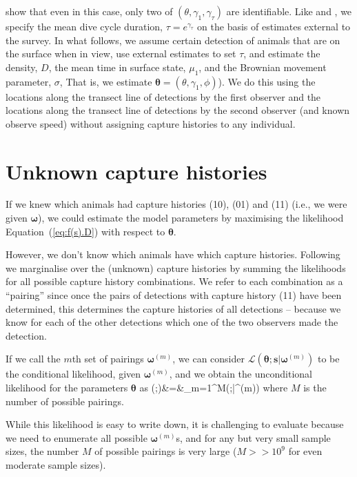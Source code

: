 \documentclass[useAMS, usenatbib, referee]{biom}\usepackage[]{graphicx}\usepackage[]{color}
\begin{document}
\cite{Stevenson+al:18} show that even in this case, only two of $(\theta,\gamma_1,\gamma_\tau)$ are identifiable. Like  \cite{Stevenson+al:18} and \cite{Hiby+Lovell:98}, we specify the mean dive cycle duration, $\tau=e^{\gamma_\tau}$ on the basis of estimates external to the survey. In what follows, we assume certain detection of animals that are on the surface when in view, use external estimates to set $\tau$, and estimate the density, $D$, the mean time in surface state, $\mu_1$, and the Brownian movement parameter, $\sigma$, That is, we estimate $\bm{\theta}=(\theta,\gamma_1, \phi)$). We do this using the locations along the transect line of detections by the first observer and the locations along the transect line of detections by the second observer (and known observe speed) without assigning capture histories to any individual.

\section{Unknown capture histories}

If we knew which animals had capture histories (10), (01) and (11) (i.e., we were given $\bm{\omega}$), we could estimate the model parameters by maximising the likelihood Equation~(\ref{eq:f(s).D}) with respect to $\bm{\theta}$.

However, we don't know which animals have which capture histories. Following \cite{Hiby+Lovell:98} we marginalise over the (unknown) capture histories by summing the likelihoods for all possible capture history combinations. We refer to each combination as a ``pairing'' since once the pairs of detections with capture history (11) have been determined, this determines the capture histories of all detections -- because we know for each of the other detections which one of the two observers made the detection.

If we call the $m$th set of pairings $\bm{\omega}^{(m)}$, we can consider $\mathcal{L}(\bm{\theta};\bm{s}|\bm{\omega}^{(m)})$ to be the conditional likelihood, given $\bm{\omega}^{(m)}$, and we obtain the unconditional likelihood for the parameters $\bm{\theta}$ as
\be
{}(\bm{\theta};)&=&\sum_{m=1}^M(\bm{\theta};|\bm{\omega}^{(m)})
\ee
\noindent
where $M$ is the number of possible pairings.

While this likelihood is easy to write down, it is challenging to evaluate because we need to enumerate all possible $\bm{\omega}^{(m)}$s, and for any but very small sample sizes, the number $M$ of possible pairings is very large ($M>>10^9$ for even moderate sample sizes).
\end{document}
